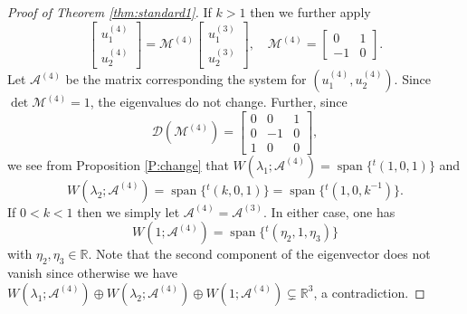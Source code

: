 \documentclass[11pt,a4paper,twosides]{amsart}
\theoremstyle{plain}
\theoremstyle{remark}
\numberwithin{equation}{section}
\newcommand{\R}{\mathbb{R}}
\DeclareMathOperator{\Span}{span}
\theoremstyle{definition}
\newcommand{\1}{{\bf 1}_{\{|x| < |t|\}}}
\begin{document}
\begin{proof}[Proof of Theorem \ref{thm:standard1}]
If $k>1$ then we further apply
\[
	\begin{bmatrix}
	u_1^{(4)}\\
	u_2^{(4)}
	\end{bmatrix}
	=
	\mathscr{M}^{(4)}
	\begin{bmatrix}
	u_1^{(3)}\\
	u_2^{(3)}
	\end{bmatrix}, \quad
	\mathscr{M}^{(4)}=\begin{bmatrix}
	0 & 1 \\
	-1 & 0
	\end{bmatrix}.
\]
Let $\mathscr{A}^{(4)}$ be the matrix corresponding the system for $(u_1^{(4)},u_2^{(4)})$. 
Since $\det \mathscr{M}^{(4)}=1$, the eigenvalues do not change. 
Further, since
\[
	\mathcal{D}(\mathscr{M}^{(4)})
	=\begin{bmatrix}
	0 & 0 & 1 \\
	0 & -1 & 0 \\
	1 & 0 & 0
	\end{bmatrix},
\]
we see from Proposition \ref{P:change}
that $W(\lambda_1;\mathscr{A}^{(4)}) = \Span \{{}^t\!(1,0,1) \}$
and
\[
	W(\lambda_2;\mathscr{A}^{(4)}) = \Span \{{}^t\!(k,0,1) \}
	= \Span \{{}^t\!(1,0,k^{-1}) \}.
\]
If $0<k<1$ then we 
simply let $\mathscr{A}^{(4)}=\mathscr{A}^{(3)}$.
In either case, one has
\[
	W(1; \mathscr{A}^{(4)})
	= \Span \{{}^t\! (\eta_2,1,\eta_3)\}
\]
with $\eta_2,\eta_3\in\R$. Note that the second component of the eigenvector does not vanish since otherwise we have $W(\lambda_1;\mathscr{A}^{(4)})\oplus W(\lambda_2;\mathscr{A}^{(4)})\oplus W(1;\mathscr{A}^{(4)})  \subsetneq \R^3$, a contradiction.


\end{proof}
\end{document}
